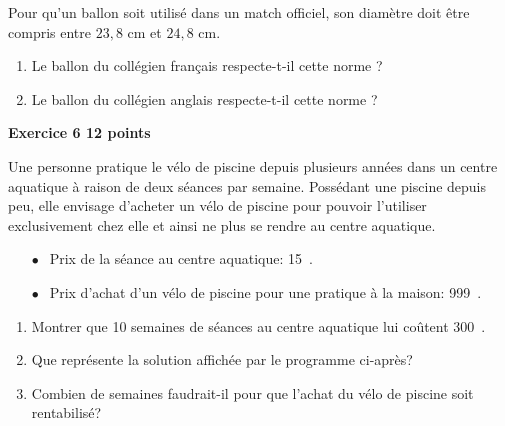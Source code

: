 \documentclass[10pt]{article}
\newcommand{\euro}{\eurologo{}}
\begin{document}
Pour qu'un ballon soit utilisé dans un match officiel, son diamètre doit être compris
entre $23,8$ cm et $24,8$ cm.

\medskip

\begin{enumerate}
\item Le ballon du collégien français respecte-t-il cette norme ?
\item  Le ballon du collégien anglais respecte-t-il cette norme ?
\end{enumerate}

\bigskip

\textbf{Exercice 6 \hfill 12 points}

\medskip

Une personne pratique le vélo de piscine depuis plusieurs années dans un centre
aquatique à raison de deux séances par semaine. Possédant une piscine depuis peu,
elle envisage d'acheter un vélo de piscine pour pouvoir l'utiliser exclusivement chez
elle et ainsi ne plus se rendre au centre aquatique.

\medskip

\setlength\parindent{6mm}
\begin{itemize}
\item[$\bullet~~$] Prix de la séance au centre aquatique: 15~\euro.
\item[$\bullet~~$] Prix d'achat d'un vélo de piscine pour une pratique à la maison: 999~\euro.
\end{itemize}
\setlength\parindent{0mm}

\medskip

\begin{enumerate}
\item Montrer que 10 semaines de séances au centre aquatique lui coûtent 300~\euro.
\item Que représente la solution affichée par le programme ci-après?

\begin{center}
\begin{scratch}
{
}

\end{scratch}
\end{center}

\item  Combien de semaines faudrait-il pour que l'achat du vélo de piscine soit
rentabilisé?
\end{enumerate}
\end{document}
